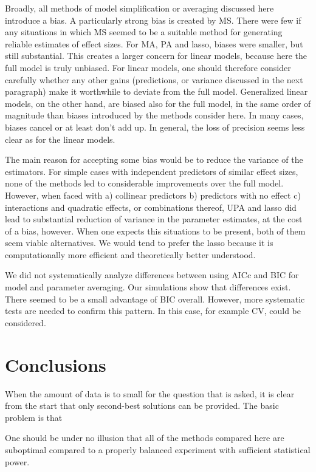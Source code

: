 \documentclass[5p]{elsarticle}
\begin{document}
Broadly, all methods of model simplification or averaging discussed here introduce a bias. A particularly strong bias is created by MS. There were few if any situations in which MS seemed to be a suitable method for generating reliable estimates of effect sizes. For MA, PA and lasso, biases were smaller, but still substantial. This creates a larger concern for linear models, because here the full model is truly unbiased. For linear models, one should therefore consider carefully whether any other gains (predictions, or variance discussed in the next paragraph) make it worthwhile to deviate from the full model. Generalized linear models, on the other hand, are biased also for the full model, in the same order of magnitude than biases introduced by the methods consider here. In many cases, biases cancel or at least don't add up. In general, the loss of precision seems less clear as for the linear models. 

The main reason for accepting some bias would be to reduce the variance of the estimators. For simple cases with independent predictors of similar effect sizes, none of the methods led to considerable improvements over the full model. However, when faced with a) collinear predictors b) predictors with no effect c) interactions and quadratic effects, or combinations thereof, UPA and lasso did lead to substantial reduction of variance in the parameter estimates, at the cost of a bias, however. When one expects this situations to be present, both of them seem viable alternatives. We would tend to prefer the lasso because it is computationally more efficient and theoretically better understood. 

We did not systematically analyze differences between using AICc and BIC for model and parameter averaging. Our simulations show that differences exist. There seemed to be a small advantage of BIC overall. However, more systematic tests are needed to confirm this pattern. In this case, for example CV, could be considered.  

\section{Conclusions}

When the amount of data is to small for the question that is asked, it is clear from the start that only second-best solutions can be provided. The basic problem is that 



One should be under no illusion that all of the methods compared here are suboptimal compared to a properly balanced experiment with sufficient statistical power. 
\end{document}
